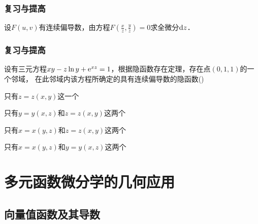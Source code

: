 \documentclass[14pt,notheorems,leqno,xcolor={rgb}]{beamer} %
\begin{document}
\begin{frame}
\frametitle{复习与提高}
\begin{puzzle}
设$F(u,v)$有连续偏导数，由方程$F\left(\frac{x}z,\frac{y}z\right)=0$求全微分$\mathop{}\!\mathrm{d} z$．
\end{puzzle}
\end{frame}

\begin{frame}
\frametitle{复习与提高}
\begin{choice}%
设有三元方程$xy-z\ln y+\mathrm{e}^{xz}=1$，根据隐函数存在定理，存在点$(0,1,1)$的一个邻域，
在此邻域内该方程所确定的具有连续偏导数的隐函数\dotfill()
\begin{choiceline}
  \item 只有$z=z(x,y)$这一个
  \item 只有$y=y(x,z)$和$z=z(x,y)$这两个
  \item 只有$x=x(y,z)$和$z=z(x,y)$这两个
  \item 只有$x=x(y,z)$和$y=y(x,z)$这两个
\end{choiceline} 
\end{choice}
\end{frame}

\ifligong %

\section{多元函数微分学的几何应用}

\subsection{向量值函数及其导数}
\end{document}
